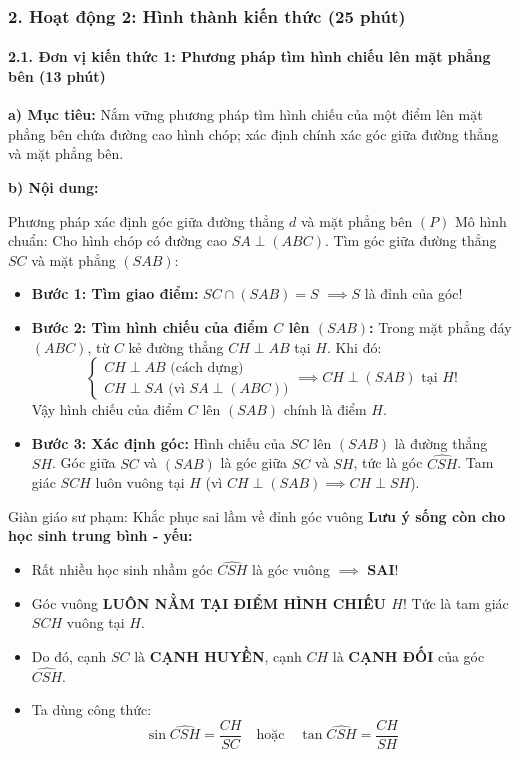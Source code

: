 \documentclass[12pt, a4paper]{article}
\begin{document}
\subsubsection*{2. Hoạt động 2: Hình thành kiến thức (25 phút)}

\paragraph{2.1. Đơn vị kiến thức 1: Phương pháp tìm hình chiếu lên mặt phẳng bên (13 phút)}

\noindent \textbf{a) Mục tiêu:}
Nắm vững phương pháp tìm hình chiếu của một điểm lên mặt phẳng bên chứa đường cao hình chóp; xác định chính xác góc giữa đường thẳng và mặt phẳng bên.

\noindent \textbf{b) Nội dung:}
\begin{pedabox}{Phương pháp xác định góc giữa đường thẳng $d$ và mặt phẳng bên $(P)$}
Mô hình chuẩn: Cho hình chóp có đường cao $SA \perp (ABC)$. Tìm góc giữa đường thẳng $SC$ và mặt phẳng $(SAB)$:
\begin{itemize}[leftmargin=0.6cm]
    \item \textbf{Bước 1: Tìm giao điểm:} $SC \cap (SAB) = S$ $\implies S$ là đỉnh của góc!
    \item \textbf{Bước 2: Tìm hình chiếu của điểm $C$ lên $(SAB)$:}
    Trong mặt phẳng đáy $(ABC)$, từ $C$ kẻ đường thẳng $CH \perp AB$ tại $H$.
    Khi đó:
    $$\begin{cases} CH \perp AB\text{ (cách dựng)} \\ CH \perp SA\text{ (vì } SA \perp (ABC)) \end{cases} \implies CH \perp (SAB)\text{ tại } H!$$
    Vậy hình chiếu của điểm $C$ lên $(SAB)$ chính là điểm $H$.
    \item \textbf{Bước 3: Xác định góc:}
    Hình chiếu của $SC$ lên $(SAB)$ là đường thẳng $SH$.
    Góc giữa $SC$ và $(SAB)$ là góc giữa $SC$ và $SH$, tức là góc $\widehat{CSH}$.
    Tam giác $SCH$ luôn vuông tại $H$ (vì $CH \perp (SAB) \implies CH \perp SH$).
\end{itemize}
\end{pedabox}

\begin{scaffoldbox}{Giàn giáo sư phạm: Khắc phục sai lầm về đỉnh góc vuông}
\textbf{Lưu ý sống còn cho học sinh trung bình - yếu:}
\begin{itemize}
    \item Rất nhiều học sinh nhầm góc $\widehat{CSH}$ là góc vuông $\implies$ \textbf{SAI}!
    \item Góc vuông \textbf{LUÔN NẰM TẠI ĐIỂM HÌNH CHIẾU $H$}! Tức là tam giác $SCH$ vuông tại $H$.
    \item Do đó, cạnh $SC$ là \textbf{CẠNH HUYỀN}, cạnh $CH$ là \textbf{CẠNH ĐỐI} của góc $\widehat{CSH}$.
    \item Ta dùng công thức:
    $$\sin \widehat{CSH} = \dfrac{CH}{SC} \quad \text{hoặc} \quad \tan \widehat{CSH} = \dfrac{CH}{SH}$$
\end{itemize}
\end{scaffoldbox}
\end{document}
